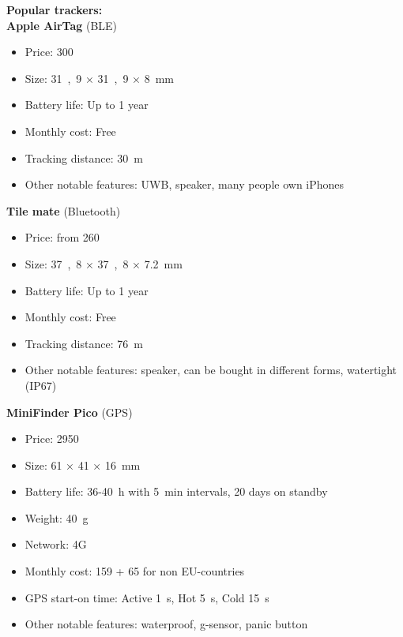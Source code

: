 \iffalse
\textbf{Popular trackers:}\\
\textbf{Apple AirTag} (\ac{BLE})
\begin{itemize}[label={}, noitemsep, leftmargin=0pt]
    \item Price: \SI{300}{\dkk}
    \item Size: \si{31,9} × \si{31,9} × \SI{8}{\milli\meter}
    \item Battery life: Up to 1 year
    \item Monthly cost: Free
    \item Tracking distance: \SI{30}{\meter}
    \item Other notable features: \ac{UWB}, speaker, many people own iPhones
\end{itemize}

\textbf{Tile mate} (Bluetooth)
\begin{itemize}[label={}, noitemsep, leftmargin=0pt]
    \item Price: from \SI{260}{\dkk}
    \item Size: \si{37,8} × \si{37,8} × \SI{7.2}{\milli\meter}
    \item Battery life: Up to 1 year
    \item Monthly cost: Free
    \item Tracking distance: \SI{76}{\meter}
    \item Other notable features: speaker, can be bought in different forms, watertight (IP67)
\end{itemize}

\textbf{MiniFinder Pico} (\ac{GPS})
\begin{itemize}[label={}, noitemsep, leftmargin=0pt]
    \item Price: \SI{2950}{\dkk}
    \item Size: \si{61} × \si{41} × \SI{16}{\milli\meter}
    \item Battery life: \si{36}-\SI{40}{\hour} with \SI{5}{\minute} intervals, 20 days on standby
    \item Weight: \SI{40}{\gram}
    \item Network: 4G
    \item Monthly cost: \SI{159}{\dkk} + \SI{65}{\dkk} for non EU-countries
    \item \ac{GPS} start-on time: Active \SI{1}{\second}, Hot \SI{5}{\second}, Cold \SI{15}{\second}
    \item Other notable features: waterproof, g-sensor, panic button
\end{itemize}


